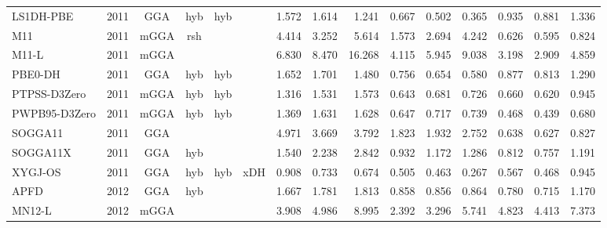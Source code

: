 \begin{landscape}
\begin{longtable}{lc:cccc:rrr:rrr:rrr}
    LS1DH-PBE        & 2011 & GGA  & hyb      & hyb         &           & 1.572             & 1.614             & 1.241  & 0.667              & 0.502             & 0.365  & 0.935   & 0.881 & 1.336 \\
    M11              & 2011 & mGGA & rsh      &             &           & 4.414             & 3.252             & 5.614  & 1.573              & 2.694             & 4.242  & 0.626   & 0.595 & 0.824 \\
    M11-L            & 2011 & mGGA &          &             &           & 6.830             & 8.470             & 16.268 & 4.115              & 5.945             & 9.038  & 3.198   & 2.909 & 4.859 \\
    PBE0-DH          & 2011 & GGA  & hyb      & hyb         &           & 1.652             & 1.701             & 1.480  & 0.756              & 0.654             & 0.580  & 0.877   & 0.813 & 1.290 \\
    PTPSS-D3Zero     & 2011 & mGGA & hyb      & hyb         &           & 1.316             & 1.531             & 1.573  & 0.643              & 0.681             & 0.726  & 0.660   & 0.620 & 0.945 \\
    PWPB95-D3Zero    & 2011 & mGGA & hyb      & hyb         &           & 1.369             & 1.631             & 1.628  & 0.647              & 0.717             & 0.739  & 0.468   & 0.439 & 0.680 \\
    SOGGA11          & 2011 & GGA  &          &             &           & 4.971             & 3.669             & 3.792  & 1.823              & 1.932             & 2.752  & 0.638   & 0.627 & 0.827 \\
    SOGGA11X         & 2011 & GGA  & hyb      &             &           & 1.540             & 2.238             & 2.842  & 0.932              & 1.172             & 1.286  & 0.812   & 0.757 & 1.191 \\
    XYGJ-OS          & 2011 & GGA  & hyb      & hyb         & xDH       & 0.908             & 0.733             & 0.674  & 0.505              & 0.463             & 0.267  & 0.567   & 0.468 & 0.945 \\
    APFD             & 2012 & GGA  & hyb      &             &           & 1.667             & 1.781             & 1.813  & 0.858              & 0.856             & 0.864  & 0.780   & 0.715 & 1.170 \\
    MN12-L           & 2012 & mGGA &          &             &           & 3.908             & 4.986             & 8.995  & 2.392              & 3.296             & 5.741  & 4.823   & 4.413 & 7.373 \\

\end{longtable}
\end{landscape}

